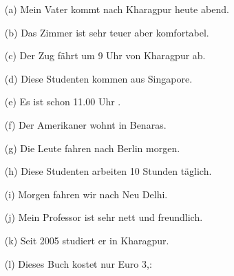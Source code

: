 \documentclass{article}
\begin{document}
\begin{enumerate}
    \item[(a)] Mein Vater kommt nach Kharagpur heute abend.
    \item[(b)] Das Zimmer ist sehr teuer aber komfortabel.
    \item[(c)] Der Zug fährt um 9 Uhr von Kharagpur ab.
    \item[(d)] Diese Studenten kommen aus Singapore.
    \item[(e)] Es ist schon 11.00 Uhr .
    \item[(f)] Der Amerikaner wohnt in Benaras.
    \item[(g)] Die Leute fahren nach Berlin morgen.
    \item[(h)] Diese Studenten arbeiten 10 Stunden täglich.
    \item[(i)] Morgen fahren wir nach Neu Delhi.
    \item[(j)] Mein Professor ist sehr nett und freundlich.
    \item[(k)] Seit 2005 studiert er in Kharagpur.
    \item[(l)] Dieses Buch kostet nur Euro 3,:
\end{enumerate}
\end{document}
